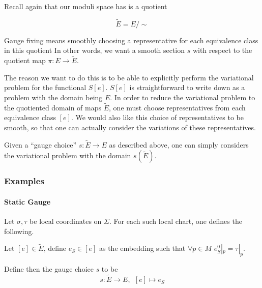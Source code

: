 \documentclass{article}
\begin{document}
                Recall again that our moduli space has is a quotient

                \begin{equation}
                    \tilde E = E / \sim
                \end{equation}

                Gauge fixing means smoothly choosing a representative for each equivalence class in this quotient In other words, we want a smooth section $s$ with respect to the quotient map $\pi: E \to \tilde E$.

                The reason we want to do this is to be able to explicitly perform the variational problem for the functional $S[e]$. $S[e]$ is straightforward to write down as a problem with the domain being $E$. In order to reduce the variational problem to the quotiented domain of maps $\tilde E$, one must choose representatives from each equivalence class $[e]$. We would also like this choice of representatives to be smooth, so that one can actually consider the variations of these representatives.

                Given a ``gauge choice'' $s: \tilde E \to E$ as described above, one can simply considers the variational problem with the domain $s(\tilde E)$.

            \subsubsection{Examples}
                \paragraph{Static Gauge}
                    Let $\sigma, \tau$ be local coordinates on $\Sigma$. For each such local chart, one defines the following.

                    Let $[e] \in \tilde E$, define $e_S \in [e]$ as the embedding such that $\forall p \in M$ $e_S^0|_p = \tau|_p$.


                    Define then the gauge choice $s$ to be 
                    \begin{equation}
                        s: \tilde E \to E, ~~ [e] \mapsto e_S
                    \end{equation}
\end{document}
